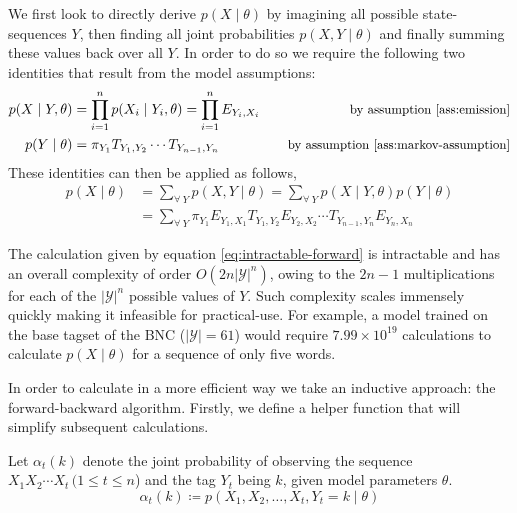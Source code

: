 \documentclass[../main.tex]{subfiles}
\begin{document}
We first look to directly derive $p(X \mid \theta)$ by imagining all possible state-sequences $Y$, then finding all joint probabilities $p(X, Y \mid \theta)$ and finally summing these values back over all $Y$. In order to do so we require the following two identities that result from the model assumptions:
\begin{alignat*}{2}
    p(X \mid Y, \theta) &= \prod_{i=1}^n p(X_i \mid Y_i, \theta) = \prod_{i=1}^n E_{Y_i,X_i} \quad & \text{\small by assumption \ref{ass:emission}} \\
    p(Y \mid \theta) &= \pi_{Y_1} T_{Y_1,Y_2} \cdots T_{Y_{n-1},Y_n} \quad & \text{\small by assumption \ref{ass:markov-assumption}}
\end{alignat*}
These identities can then be applied as follows,
\begin{align*}
    p(X \mid \theta) &= \sum_{\forall \: Y} p(X,Y \mid \theta) = \sum_{\forall \: Y} p(X \mid Y, \theta) p(Y \mid \theta) \\
    &= \sum_{\forall \: Y} \pi_{Y_1} E_{Y_1, X_1} T_{Y_1, Y_2} E_{Y_2, X_2} \cdots T_{Y_{n-1}, Y_n} E_{Y_n, X_n} \label{eq:intractable-forward}
\end{align*}

The calculation given by equation \ref{eq:intractable-forward} is intractable and has an overall complexity of order $O(2n|\mathcal{Y}|^n)$, owing to the $2n - 1$ multiplications for each of the $|\mathcal{Y}|^n$ possible values of $Y$.
Such complexity scales immensely quickly making it infeasible for practical-use. For example, a model trained on the base tagset of the BNC ($|\mathcal{Y}|=61$) \autocite{bnc-corpus} would require $7.99 \times 10^{19}$ calculations to calculate $p(X \mid \theta)$ for a sequence of only five words.

In order to calculate in a more efficient way we take an inductive approach: the forward-backward algorithm.
Firstly, we define a helper function that will simplify subsequent calculations.

\begin{definition} \label{def:forward-func}
    Let $\alpha_t(k)$ denote the joint probability of observing the sequence $X_1 X_2 \cdots X_t \, (1 \leq t \leq n$) and the tag $Y_t$ being $k$, given model parameters $\theta$.
    \begin{equation*}
        \alpha_t(k) \coloneqq p (X_1,X_2,\ldots,X_t,Y_t=k \mid \theta)
    \end{equation*}
\end{definition}
\end{document}
